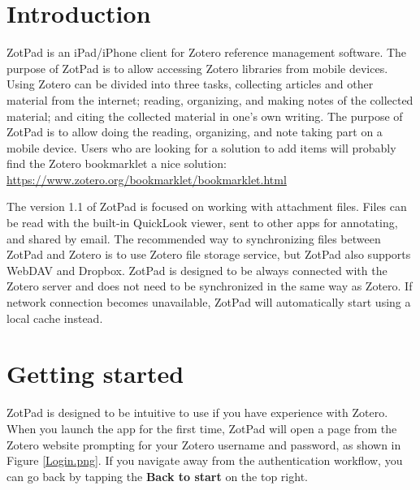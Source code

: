 \documentclass[oneside, openany, 12pt]{tufte-book}
\newcommand{\iphone}[1]{#1}
\newcommand{\ipadfootnote}[1]{}
\newcommand{\iphone}[1]{}
\newcommand{\ipadfootnote}[1]{\footnote{#1}}
\begin{document}
\maketitle

\tableofcontents


\chapter{Introduction}




ZotPad is an iPad/iPhone client for Zotero reference management software. The purpose of ZotPad is to allow accessing Zotero libraries from mobile devices. Using Zotero can be divided into three tasks, collecting articles and other material from the internet; reading, organizing, and making notes of the collected material; and citing the collected material in one's own writing. The purpose of ZotPad is to allow doing the reading, organizing, and note taking part on a mobile device\ipadfootnote{During the summer 2012 Zotero developers announced a Zotero bookmarklet that can be used to add items directly from mobile safari. More information about the bookmarklet can be found on the Zotero website at\url{https://www.zotero.org/bookmarklet/bookmarklet.html}}. \iphone{Users who are looking for a solution to add items will probably find the Zotero bookmarklet a nice solution: \url{https://www.zotero.org/bookmarklet/bookmarklet.html}}

The version 1.1 of ZotPad is focused on working with attachment files. Files can be read with the built-in QuickLook viewer, sent to other apps for annotating, and shared by email. The recommended way to synchronizing files between ZotPad and Zotero is to use Zotero file storage service, but ZotPad also supports WebDAV and Dropbox. ZotPad is designed to be always connected with the Zotero server and does not need to be synchronized in the same way as Zotero. If network connection becomes unavailable, ZotPad will automatically start using a local cache instead.

\chapter{Getting started}

ZotPad is designed to be intuitive to use if you have experience with Zotero. When you launch the app for the first time, ZotPad will open a page from the Zotero website prompting for your Zotero username and password, as shown in Figure \ref{Login.png}. If you navigate away from the authentication workflow, you can go back by tapping the \textbf{Back to start} on the top right.
\end{document}
